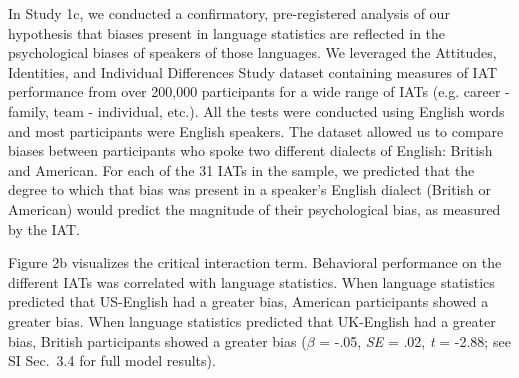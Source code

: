 \documentclass[9pt,twocolumn,twoside]{pnas-new}
\begin{document}
In Study 1c, we conducted a confirmatory, pre-registered analysis of our hypothesis that biases present in language statistics are reflected in the psychological biases of speakers of those languages. We leveraged the Attitudes, Identities, and Individual Differences Study dataset \citep[AIID,][]{aiid} containing measures of IAT performance from over 200,000 participants for a wide range of IATs (e.g. career - family, team - individual, etc.). All the tests were conducted using English words and most participants were English speakers. The dataset allowed us to compare biases between participants who spoke two different dialects of English: British and American. For each of the 31 IATs in the sample, we predicted that the degree to which that bias was present in a speaker’s English dialect (British or American) would predict the magnitude of their psychological bias, as measured by the IAT.



Figure 2b visualizes the critical interaction term. Behavioral performance on the different IATs was correlated with language statistics. When language statistics predicted that US-English had a greater bias, American participants showed a greater bias. When language statistics predicted that UK-English had a greater bias, British participants showed a greater bias (\(\beta\) = -.05, \emph{SE} = .02, \emph{t} = -2.88; see SI Sec.\ 3.4 for full model results).
\end{document}
